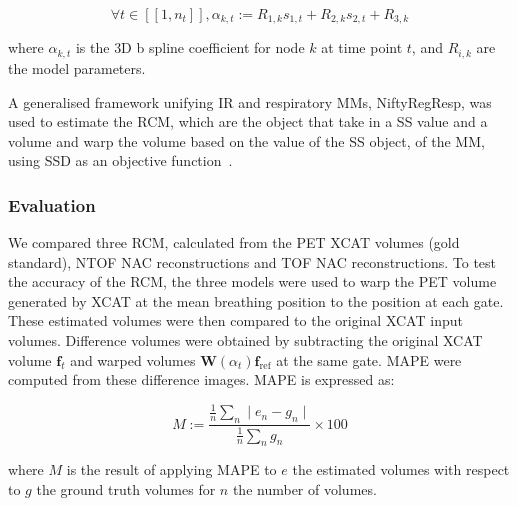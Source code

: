                \begin{equation}  \label{eq:b_spline_coefficients}
                    \forall t \in [[1,n_t]], \alpha_{k,t} := R_{1,k} s_{1,t} + R_{2,k} s_{2,t} + R_{3,k}
                \end{equation}
                
                \noindent where $\alpha_{k,t}$ is the \gls{3D} b spline coefficient for node $k$ at time point $t$, and $R_{i,k}$ are the model parameters.
            
                A generalised framework unifying \gls{IR} and respiratory \gls{MM}s, NiftyRegResp, was used to estimate the \gls{RCM}, which are the object that take in a \gls{SS} value and a volume and warp the volume based on the value of the \gls{SS} object, of the \gls{MM}, using \gls{SSD} as an objective function~.
                
            \subsubsection{Evaluation} \label{sec:impact_of_tof_on_respiratory_motion_modelling_using_nac_pet_methods_evaluation}
                We compared three \gls{RCM}, calculated from the \gls{PET} \gls{XCAT} volumes (gold standard), \gls{NTOF} \gls{NAC} reconstructions and \gls{TOF} \gls{NAC} reconstructions. To test the accuracy of the \gls{RCM}, the three models were used to warp the \gls{PET} volume generated by \gls{XCAT} at the mean breathing position to the position at each gate. These estimated volumes were then compared to the original \gls{XCAT} input volumes. Difference volumes were obtained by subtracting the original \gls{XCAT} volume $\mathbf{f}_t$ and warped volumes $\mathbf{W}(\alpha_t) \mathbf{f}_\mathrm{ref}$ at the same gate. \gls{MAPE} were computed from these difference images. \gls{MAPE} is expressed as:
                
                \begin{equation}  \label{eq:mape}
                   M := \frac{\frac{1}{n}\sum_{n}\mid e_n - g_n \mid}{\frac{1}{n}\sum_{n}g_n} \times 100
                \end{equation}
                
                \noindent where $M$ is the result of applying \gls{MAPE} to $e$ the estimated volumes with respect to $g$ the ground truth volumes for $n$ the number of volumes.
                
